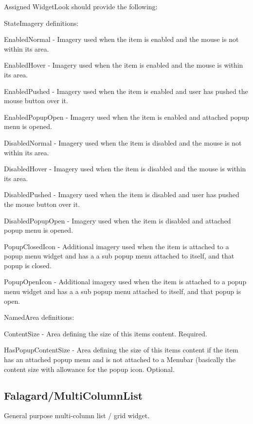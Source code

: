 Assigned Widget\+Look should provide the following\+: 
\begin{DoxyItemize}
\item State\+Imagery definitions\+: 
\begin{DoxyItemize}
\item Enabled\+Normal -\/ Imagery used when the item is enabled and the mouse is not within its area. 
\item Enabled\+Hover -\/ Imagery used when the item is enabled and the mouse is within its area. 
\item Enabled\+Pushed -\/ Imagery used when the item is enabled and user has pushed the mouse button over it. 
\item Enabled\+Popup\+Open -\/ Imagery used when the item is enabled and attached popup menu is opened. 
\item Disabled\+Normal -\/ Imagery used when the item is disabled and the mouse is not within its area. 
\item Disabled\+Hover -\/ Imagery used when the item is disabled and the mouse is within its area. 
\item Disabled\+Pushed -\/ Imagery used when the item is disabled and user has pushed the mouse button over it. 
\item Disabled\+Popup\+Open -\/ Imagery used when the item is disabled and attached popup menu is opened. 
\item Popup\+Closed\+Icon -\/ Additional imagery used when the item is attached to a popup menu widget and has a a \textquotesingle{}sub\textquotesingle{} popup menu attached to itself, and that popup is closed. 
\item Popup\+Open\+Icon -\/ Additional imagery used when the item is attached to a popup menu widget and has a a \textquotesingle{}sub\textquotesingle{} popup menu attached to itself, and that popup is open. 
\end{DoxyItemize}


\item Named\+Area definitions\+: 
\begin{DoxyItemize}
\item Content\+Size -\/ Area defining the size of this item\textquotesingle{}s content. Required. 
\item Has\+Popup\+Content\+Size -\/ Area defining the size of this item\textquotesingle{}s content if the item has an attached popup menu and is not attached to a Menubar (basically the content size with allowance for the \textquotesingle{}popup icon\textquotesingle{}. Optional. 
\end{DoxyItemize}
\end{DoxyItemize}\hypertarget{fal_wr_ref_fal_wr_ref_sec_12}{}\subsection{Falagard/\+Multi\+Column\+List}\label{fal_wr_ref_fal_wr_ref_sec_12}
General purpose multi-\/column list / grid widget.

